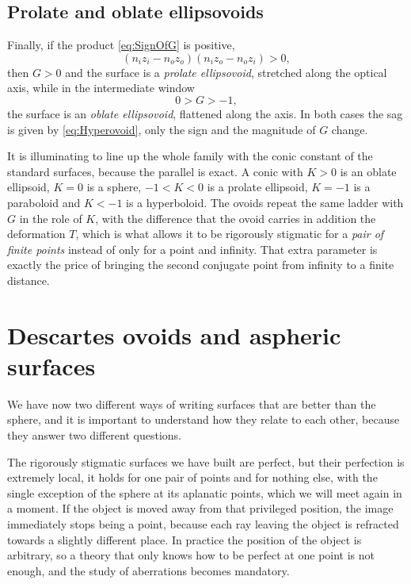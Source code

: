             \subsection{Prolate and oblate ellipsovoids}

                Finally, if the product \ref{eq:SignOfG} is positive,
                \begin{equation}\label{eq:EllipsovoidCondition}
                    \left( n_iz_i - n_oz_o \right)\left( n_iz_o - n_oz_i \right) > 0,
                \end{equation}
                then $G>0$ and the surface is a \emph{prolate ellipsovoid}, stretched along the optical axis, while in the intermediate window
                \begin{equation}\label{eq:OblateCondition}
                    0 > G > -1,
                \end{equation}
                the surface is an \emph{oblate ellipsovoid}, flattened along the axis. In both cases the sag is given by \ref{eq:Hyperovoid}, only the sign and the magnitude of $G$ change.

                It is illuminating to line up the whole family with the conic constant of the standard surfaces, because the parallel is exact. A conic with $K>0$ is an oblate ellipsoid, $K=0$ is a sphere, $-1<K<0$ is a prolate ellipsoid, $K=-1$ is a paraboloid and $K<-1$ is a hyperboloid. The ovoids repeat the same ladder with $G$ in the role of $K$, with the difference that the ovoid carries in addition the deformation $T$, which is what allows it to be rigorously stigmatic for a \textit{pair of finite points} instead of only for a point and infinity. That extra parameter is exactly the price of bringing the second conjugate point from infinity to a finite distance.

        \section{Descartes ovoids and aspheric surfaces}

                We have now two different ways of writing surfaces that are better than the sphere, and it is important to understand how they relate to each other, because they answer two different questions.

                The rigorously stigmatic surfaces we have built are perfect, but their perfection is extremely local, it holds for one pair of points and for nothing else, with the single exception of the sphere at its aplanatic points, which we will meet again in a moment. If the object is moved away from that privileged position, the image immediately stops being a point, because each ray leaving the object is refracted towards a slightly different place. In practice the position of the object is arbitrary, so a theory that only knows how to be perfect at one point is not enough, and the study of aberrations becomes mandatory.

